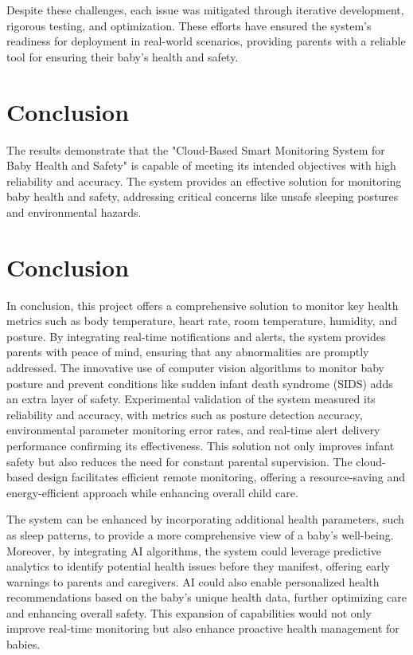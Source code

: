\documentclass[12pt,a4paper]{report}
\begin{document}
Despite these challenges, each issue was mitigated through iterative development, rigorous testing, and optimization. These efforts have ensured the system's readiness for deployment in real-world scenarios, providing parents with a reliable tool for ensuring their baby's health and safety.


\section{Conclusion}
The results demonstrate that the "Cloud-Based Smart Monitoring System for Baby Health and Safety" is capable of meeting its intended objectives with high reliability and accuracy. The system provides an effective solution for monitoring baby health and safety, addressing critical concerns like unsafe sleeping postures and environmental hazards.
\section{Conclusion}
In conclusion, this project offers a comprehensive solution to monitor key health metrics such as body temperature, heart rate, room temperature, humidity, and posture. By integrating real-time notifications and alerts, the system provides parents with peace of mind, ensuring that any abnormalities are promptly addressed. The innovative use of computer vision algorithms to monitor baby posture and prevent conditions like sudden infant death syndrome (SIDS) adds an extra layer of safety. Experimental validation of the system measured its reliability and accuracy, with metrics such as posture detection accuracy, environmental parameter monitoring error rates, and real-time alert delivery performance confirming its effectiveness. This solution not only improves infant safety but also reduces the need for constant parental supervision. The cloud-based design facilitates efficient remote monitoring, offering a resource-saving and energy-efficient approach while enhancing overall child care.

The system can be enhanced by incorporating additional health parameters, such as sleep patterns, to provide a more comprehensive view of a baby's well-being. Moreover, by integrating AI algorithms, the system could leverage predictive analytics to identify potential health issues before they manifest, offering early warnings to parents and caregivers. AI could also enable personalized health recommendations based on the baby's unique health data, further optimizing care and enhancing overall safety. This expansion of capabilities would not only improve real-time monitoring but also enhance proactive health management for babies.
\end{document}
